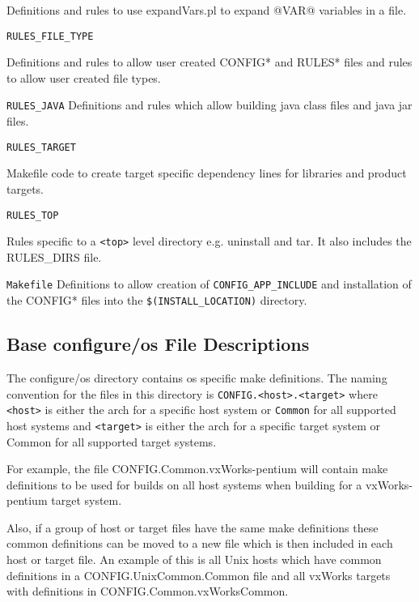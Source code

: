 \begin{description}
Definitions and rules to use expandVars.pl to expand @VAR@ variables in a file.

\item {}\verb|RULES_FILE_TYPE|

Definitions and rules to allow user created CONFIG* and RULES* files and rules to allow user created file types.

\item {}\verb|RULES_JAVA| 
Definitions and rules which allow building java class files and java jar files.

\item {}\verb|RULES_TARGET|

Makefile code to create target specific dependency lines for libraries and product targets.

\item {}\verb|RULES_TOP|

Rules specific to a \verb|<top>| level directory e.g. uninstall and tar. It also includes the RULES\_DIRS file.

\item {}\verb|Makefile|
Definitions to allow creation of \verb|CONFIG_APP_INCLUDE| and installation of the CONFIG* files into the 
\verb|$(INSTALL_LOCATION)| directory.

\end{description}

\subsection{Base configure/os File Descriptions}

The configure/os directory contains os specific make definitions. The naming convention for the files in this directory is 
\verb|CONFIG.<host>.<target>| where \verb|<host>| is either the arch for a specific host system or \verb|Common| for all supported host 
systems and \verb|<target>| is either the arch for a specific target system or Common for all supported target systems. 

For example, the file CONFIG.Common.vxWorks-pentium will contain make definitions to be used for builds on all host 
systems when building for a vxWorks-pentium target system.

Also, if a group of host or target files have the same make definitions these common definitions can be moved to a new 
file which is then included in each host or target file. An example of this is all Unix hosts which have common definitions 
in a CONFIG.UnixCommon.Common file and all vxWorks targets with definitions in 
CONFIG.Common.vxWorksCommon.

